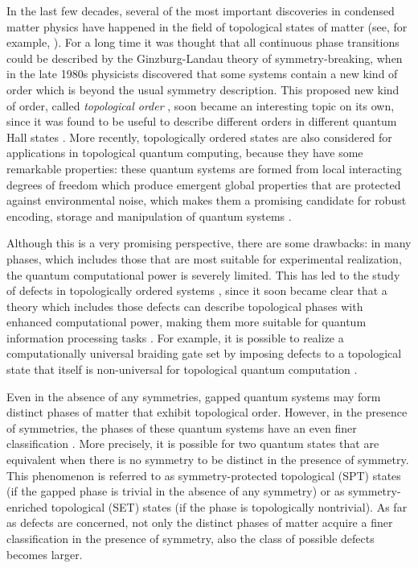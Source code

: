 
In the last few decades, several of the most important discoveries in condensed matter physics have happened in the field of topological states of matter (see, for example, \cite{Wen07,NSSFD08,HK10,QZ11}). For a long time it was thought that all continuous phase transitions could be described by the Ginzburg-Landau theory of symmetry-breaking, when in the late 1980s physicists discovered that some systems contain a new kind of order which is beyond the usual symmetry description. This proposed new kind of order, called \emph{topological order} \cite{Wen90}, soon became an interesting topic on its own, since it was found to be useful to describe different orders in different quantum Hall states \cite{WN90}. More recently, topologically ordered states are also considered for applications in topological quantum computing, because they have some remarkable properties: these quantum systems are formed from local interacting degrees of freedom which produce emergent global properties that are protected against environmental noise, which makes them a promising candidate for robust encoding, storage and manipulation of quantum systems \cite{DKLP2002,Kit03,NSSFD08,Ter15,PY15,BLPSW16}.

Although this is a very promising perspective, there are some drawbacks: in many phases, which includes those that are most suitable for experimental realization, the quantum computational power is severely limited. This has led to the study of defects in topologically ordered systems \cite{RH07,Bombin2010,KK12,FSV13,BJQ13b,BASP14,JPSV15,DIP16,CCW16,BBD17,CCW17b,CCW17,BLKW17,KPEB18,ET19}, since it soon became clear that a theory which includes those defects can describe topological phases with enhanced computational power, making them more suitable for quantum information processing tasks \cite{Freedman1998,FLW02b,FLW02,FKLW02}. For example, it is possible to realize a computationally universal braiding gate set by imposing defects to a topological state that itself is non-universal for topological quantum computation \cite{BJQ13}. 

Even in the absence of any symmetries, gapped quantum systems may form distinct phases of matter that exhibit topological order. However, in the presence of symmetries, the phases of these quantum systems have an even finer classification \cite{Wen2002,SRFL08,Kitaev2009,FK10,CGW11,FK11,TPB11,LS12,LV12,FM13,EH13,NCMT14,WPS14,K14,F14,EN14,MFCV15,BRSX15,LV16}. More precisely, it is possible for two quantum states that are equivalent when there is no symmetry to be distinct in the presence of symmetry. This phenomenon is referred to as symmetry-protected topological (SPT) states \cite{CGLW13,Yoshida2015,Yoshida2017} (if the gapped phase is trivial in the absence of any symmetry) or as symmetry-enriched topological (SET) states \cite{ENO10,MR13,WBV17} (if the phase is topologically nontrivial). As far as defects are concerned, not only the distinct phases of matter acquire a finer classification in the presence of symmetry, also the class of possible defects becomes larger. 

